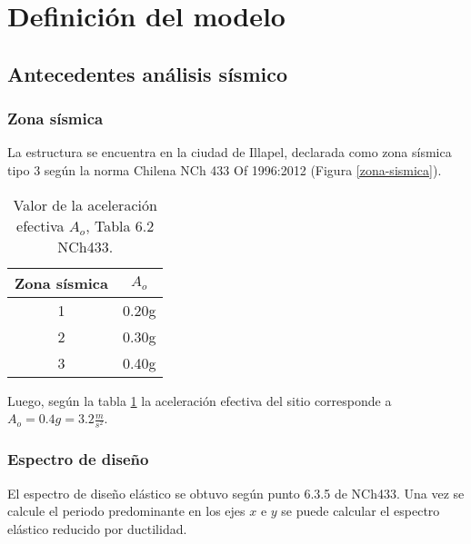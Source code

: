 \newpage
\section{Definición del modelo}

\subsection{Antecedentes análisis sísmico}

\subsubsection{Zona sísmica}
    
    La estructura se encuentra en la ciudad de Illapel, declarada como zona sísmica tipo 3 según la norma Chilena NCh 433 Of 1996:2012 (Figura \ref{zona-sismica}).

    
    \begin{table}[H]
      \centering
      \caption{Valor de la aceleración efectiva $A_o$, Tabla 6.2 NCh433.}
        \begin{tabular}{|c|c|}
        \hline
        \textbf{Zona sísmica} & \boldmath{}\textbf{$A_o$}\unboldmath{} \bigstrut\\
        \hline
        1     & 0.20g \bigstrut[t]\\
        2     & 0.30g \\
        3     & 0.40g \bigstrut[b]\\
        \hline
        \end{tabular}%
      \label{tab:zonasismicaAo}%
    \end{table}%
    
    Luego, según la tabla \ref{tab:zonasismicaAo} la aceleración efectiva del sitio corresponde a $A_o=0.4g=3.2 \frac{m}{s^2}$.
    
\subsubsection{Espectro de diseño}
    
    El espectro de diseño elástico se obtuvo según punto 6.3.5 de NCh433. Una vez se calcule el periodo predominante en los ejes $x$ e $y$ se puede calcular el espectro elástico reducido por ductilidad.

    
